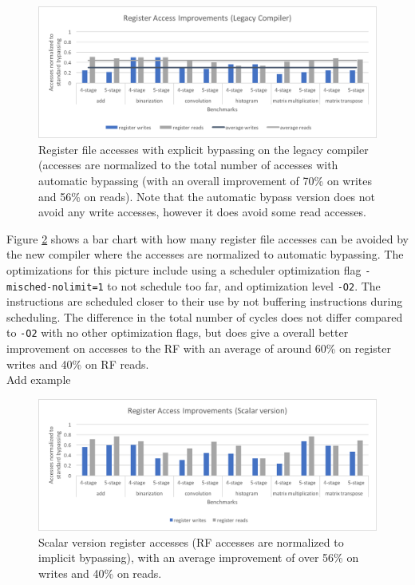 \begin{figure}[t!]
\centering
\hspace*{-.12in}
\includegraphics[width=\textwidth]{figures/legacy_access_improvement}
\caption{Register file accesses with explicit bypassing on the legacy compiler (accesses are normalized to the total number of accesses with automatic bypassing (with an overall improvement of 70\% on writes and 56\% on reads). Note that the automatic bypass version does not avoid any write accesses, however it does avoid some read accesses.}
\label{fig:legacy_access_improvements}
\end{figure}

Figure \ref{fig:scalar_improvements} shows a bar chart with how many register file accesses can be avoided by the new compiler where the accesses are normalized to automatic bypassing. The optimizations for this picture include using a scheduler optimization flag \texttt{-misched-nolimit=1} to not schedule too far, and optimization level \texttt{-O2}. The instructions are scheduled closer to their use by not buffering instructions during scheduling. The difference in the total number of cycles does not differ compared to \texttt{-O2} with no other optimization flags, but does give a overall better improvement on accesses to the RF with an average of around 60\% on register writes and 40\% on RF reads.\\

Add example \\ %



\begin{figure}[b!]
\centering
\hspace*{-.12in}
\includegraphics[width=\textwidth]{figures/scalar_version_improvements}
\caption{Scalar version register accesses (RF accesses are normalized to implicit bypassing), with an average improvement of over 56\% on writes and 40\% on reads.}
\label{fig:scalar_improvements}
\end{figure}



